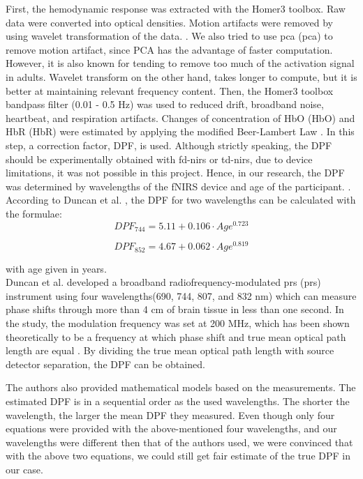 First, the hemodynamic response was extracted with the Homer3 toolbox. Raw data were converted into optical densities. Motion artifacts were removed by using wavelet transformation of the data. \citep {Molavi_2012}. We also tried to use \acrlong{pca} (\acrshort{pca}) to remove motion artifact, since PCA has the advantage of faster computation. However, it is also known for tending to remove too much of the activation signal in adults. Wavelet transform on the other hand, takes longer to compute, but it is better at maintaining relevant frequency content. Then, the Homer3 toolbox bandpass filter (0.01 - 0.5 Hz) was used to reduced drift, broadband noise, heartbeat, and respiration artifacts. Changes of concentration of \acrlong{HbO} (\acrshort{HbO}) and  \acrlong{HbR} (\acrshort{HbR}) were estimated by applying the modified Beer-Lambert Law  \citep {Delpy_1988}. In this step, a correction factor, DPF, is used. Although strictly speaking, the DPF should be experimentally obtained with \acrshort{fd-nirs} or \acrshort{td-nirs}, due to device limitations, it was not possible in this project. Hence, in our research, the DPF was determined by wavelengths of the fNIRS device and age of the participant. \citep {Duncan1996MeasurementOC}. According to Duncan et al. \citeyearpar {Duncan1996MeasurementOC}, the DPF for two wavelengths can be calculated with the formulae:
\begin{equation}
DPF_{744} = 5.11 + 0.106 \cdot Age^{0.723}
\end{equation}

\begin{equation}
DPF_{852} = 4.67 + 0.062 \cdot Age^{0.819}
\end{equation}

\noindent with age given in years.\\
 
Duncan et al. \citeyearpar{Duncan1996MeasurementOC} developed a broadband radiofrequency-modulated \acrlong{prs} (\acrshort{prs}) instrument using four wavelengths(690, 744, 807, and 832 nm) which can measure phase shifts through more than 4 cm of brain tissue in less than one second. In the study, the modulation frequency was set at 200 MHz, which has been shown theoretically to be a frequency at which phase shift and true mean optical path length are equal \citep {Arridge_1992}. By dividing the true mean optical path length with source detector  separation, the DPF can be obtained. 

The authors also provided mathematical models based on the measurements. The estimated DPF is in a sequential order as the used wavelengths. The shorter the wavelength, the larger the mean DPF they measured. Even though only four equations were provided with the above-mentioned four wavelengths, and our wavelengths were different then that of the authors used, we were convinced that with the above two equations, we could still get fair estimate of the true DPF in our case.

